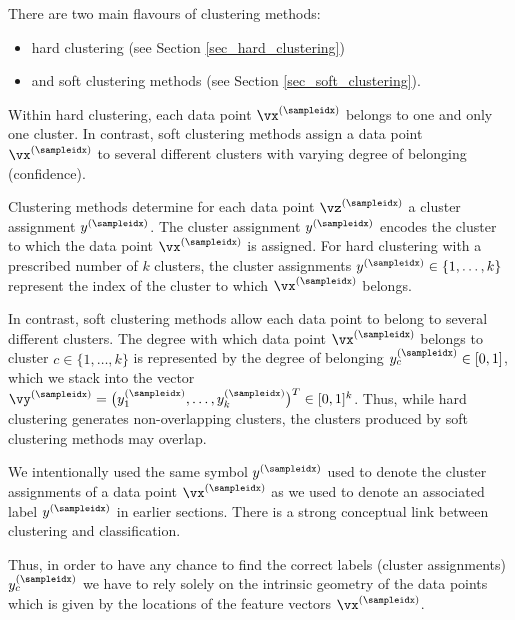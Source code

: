 \documentclass[12pt]{report}
\begin{document}
There are two main flavours of clustering methods: 
\begin{itemize} 
\item hard clustering (see Section \ref{sec_hard_clustering}) 
\item and soft clustering methods (see Section \ref{sec_soft_clustering}).
\end{itemize}
Within hard clustering, each data point $\vx^{(\sampleidx)}$ belongs to one and only one cluster. In contrast, 
soft clustering methods assign a data point $\vx^{(\sampleidx)}$ to several different clusters with varying degree 
of belonging (confidence). 

Clustering methods determine for each data point $\vz^{(\sampleidx)}$ a cluster assignment $y^{(\sampleidx)}$. 
The cluster assignment $y^{(\sampleidx)}$ encodes the cluster to which the data point $\vx^{(\sampleidx)}$ is assigned. 
For hard clustering with a prescribed number of $k$ clusters, the cluster assignments $y^{(\sampleidx)} \in \{1,\ldots,k\}$ 
represent the index of the cluster to which $\vx^{(\sampleidx)}$ belongs. 

In contrast, soft clustering methods allow each data point to belong to several different clusters. The degree with which 
data point $\vx^{(\sampleidx)}$ belongs to cluster $c \in \{1,\ldots,k\}$ is represented by the degree of belonging $y_{c}^{(\sampleidx)} \in [0,1]$, 
which we stack into the vector $\vy^{(\sampleidx)} = \big(y_{1}^{(\sampleidx)},\ldots,y_{k}^{(\sampleidx)}\big)^{T} \in [0,1]^{k}$. 
Thus, while hard clustering generates non-overlapping clusters, the clusters produced by soft clustering methods may overlap. 

We intentionally used the same symbol $y^{(\sampleidx)}$ used to denote the cluster assignments of a data point $\vx^{(\sampleidx)}$ as 
we used to denote an associated label $y^{(\sampleidx)}$ in earlier sections. There is a strong conceptual link between clustering and classification. 
\vspace*{2mm}
\begin{center}
\end{center}
Thus, in order to have any chance to find the correct labels (cluster assignments) $y_{c}^{(\sampleidx)}$ we have 
to rely solely on the intrinsic geometry of the data points which is given by the locations of the feature vectors $\vx^{(\sampleidx)}$. 
\end{document}
